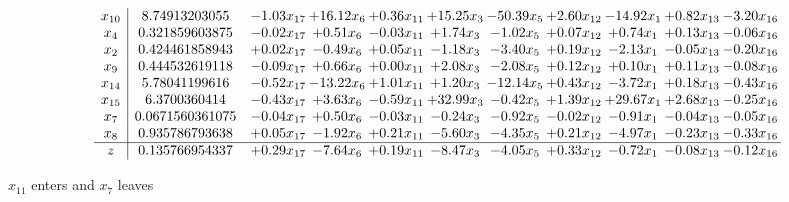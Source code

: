 \documentclass[9pt]{article}
\begin{document}
 \[\begin{array}{c| c c@{\hskip 2pt} c@{\hskip 2pt} c@{\hskip 2pt} c@{\hskip 2pt} c@{\hskip 2pt} c@{\hskip 2pt} c@{\hskip 2pt} c@{\hskip 2pt} c@{\hskip 2pt} }
 x_{10}   &  8.74913203055 & -1.03 x_{17} & + 16.12 x_{6} & +  0.36 x_{11} & + 15.25 x_{3} & -50.39 x_{5} & +  2.60 x_{12} & -14.92 x_{1} & +  0.82 x_{13} & -3.20 x_{16}\\
 x_{4}   &  0.321859603875 & -0.02 x_{17} & +  0.51 x_{6} & -0.03 x_{11} & +  1.74 x_{3} & -1.02 x_{5} & +  0.07 x_{12} & +  0.74 x_{1} & +  0.13 x_{13} & -0.06 x_{16}\\
 x_{2}   &  0.424461858943 & +  0.02 x_{17} & -0.49 x_{6} & +  0.05 x_{11} & -1.18 x_{3} & -3.40 x_{5} & +  0.19 x_{12} & -2.13 x_{1} & -0.05 x_{13} & -0.20 x_{16}\\
 x_{9}   &  0.444532619118 & -0.09 x_{17} & +  0.66 x_{6} & +  0.00 x_{11} & +  2.08 x_{3} & -2.08 x_{5} & +  0.12 x_{12} & +  0.10 x_{1} & +  0.11 x_{13} & -0.08 x_{16}\\
 x_{14}   &  5.78041199616 & -0.52 x_{17} & -13.22 x_{6} & +  1.01 x_{11} & +  1.20 x_{3} & -12.14 x_{5} & +  0.43 x_{12} & -3.72 x_{1} & +  0.18 x_{13} & -0.43 x_{16}\\
 x_{15}   &  6.3700360414 & -0.43 x_{17} & +  3.63 x_{6} & -0.59 x_{11} & + 32.99 x_{3} & -0.42 x_{5} & +  1.39 x_{12} & + 29.67 x_{1} & +  2.68 x_{13} & -0.25 x_{16}\\
 x_{7}   &  0.0671560361075 & -0.04 x_{17} & +  0.50 x_{6} & -0.03 x_{11} & -0.24 x_{3} & -0.92 x_{5} & -0.02 x_{12} & -0.91 x_{1} & -0.04 x_{13} & -0.05 x_{16}\\
 x_{8}   &  0.935786793638 & +  0.05 x_{17} & -1.92 x_{6} & +  0.21 x_{11} & -5.60 x_{3} & -4.35 x_{5} & +  0.21 x_{12} & -4.97 x_{1} & -0.23 x_{13} & -0.33 x_{16}\\
\hline
z    &  0.135766954337 & +  0.29 x_{17} & -7.64 x_{6} & +  0.19 x_{11} & -8.47 x_{3} & -4.05 x_{5} & +  0.33 x_{12} & -0.72 x_{1} & -0.08 x_{13} & -0.12 x_{16}\\
\end{array}\]


 $ x_{11} $ enters and $ x_{7} $ leaves 
\end{document}
